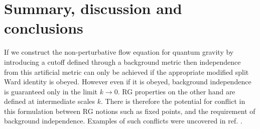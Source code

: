 \documentclass[11pt]{book} %
\begin{document}
\section{Summary, discussion and conclusions}\label{sec:conclusions}

If we construct the non-perturbative flow equation for quantum gravity by introducing a cutoff defined through a background metric then independence from this artificial metric can only be achieved if the appropriate modified split Ward identity is obeyed. However even if it is obeyed, background independence is guaranteed only in the limit $k\to0$. RG properties on the other hand are defined at intermediate scales $k$. There is therefore the potential for conflict in this formulation between RG notions such as fixed points, and the requirement of background independence. Examples of such conflicts were uncovered in ref. \cite{Dietz:2015owa}.
\end{document}

